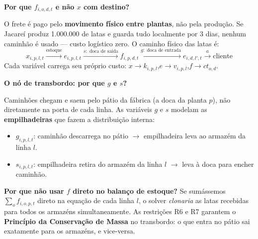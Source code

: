 \documentclass[12pt, a4paper]{article}
\begin{document}
\vspace{10pt}

\begin{mdframed}[style=destaque]
  \textbf{\color{ballblue}Por que $f_{i,o,d,t}$ e n\~{a}o $x$ com destino?}

  \medskip
  O frete \'{e} pago pelo \textbf{movimento f\'{i}sico entre plantas}, n\~{a}o pela produ\c{c}\~{a}o.
  Se Jacare\'{i} produz 1.000.000 de latas e guarda tudo localmente por 3 dias,
  nenhum caminh\~{a}o \'{e} usado --- custo log\'{i}stico zero.
  O caminho f\'{i}sico das latas \'{e}:
  \[
    x_{i,p,l,t}
    \xrightarrow{\text{estoque}}
    e_{i,p,l,t}
    \xrightarrow{s: \text{ doca de sa\'{i}da}}
    f_{i,p,d,t}
    \xrightarrow{g: \text{ doca de entrada}}
    e_{i,d,l',t}
    \xrightarrow{a}
    \text{cliente}
  \]
  Cada vari\'{a}vel carrega seu pr\'{o}prio custo:
  $x \to k_{i,p,l}$,\quad $e \to v_{i,p,l}$,\quad $f \to ct_{o,d}$.
\end{mdframed}

\vspace{8pt}

\begin{mdframed}[style=destaque]
  \textbf{\color{ballblue}O n\'{o} de transbordo: por que $g$ e $s$?}

  \medskip
  Caminh\~{o}es chegam e saem pelo p\'{a}tio da f\'{a}brica (a doca da planta $p$),
  n\~{a}o diretamente na porta de cada linha. As vari\'{a}veis $g$ e $s$ modelam
  as \textbf{empilhadeiras} que fazem a distribui\c{c}\~{a}o interna:

  \begin{itemize}[leftmargin=1.5em, itemsep=2pt]
    \item $g_{i,p,l,t}$: caminh\~{a}o descarrega no p\'{a}tio $\to$ empilhadeira leva ao armazém da linha $l$.
    \item $s_{i,p,l,t}$: empilhadeira retira do armazém da linha $l$ $\to$ leva \`{a} doca para encher caminh\~{a}o.
  \end{itemize}

  \medskip
  \textbf{Por que n\~{a}o usar $f$ direto no balan\c{c}o de estoque?}
  Se sum\'{a}ssemos $\sum_o f_{i,o,p,t}$ direto na equa\c{c}\~{a}o de cada linha $l$,
  o solver \textit{clonaria} as latas recebidas para todos os armazéns simultaneamente.
  As restri\c{c}\~{o}es R6 e R7 garantem o \textbf{Princ\'{i}pio da Conserva\c{c}\~{a}o de Massa}
  no transbordo: o que entra no p\'{a}tio sai exatamente para os armazéns, e vice-versa.
\end{mdframed}
\end{document}
